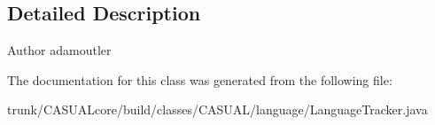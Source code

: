 \subsection{Detailed Description}
\begin{DoxyAuthor}{Author}
adamoutler 
\end{DoxyAuthor}


The documentation for this class was generated from the following file\-:\begin{DoxyCompactItemize}
\item 
trunk/\-C\-A\-S\-U\-A\-Lcore/build/classes/\-C\-A\-S\-U\-A\-L/language/Language\-Tracker.\-java\end{DoxyCompactItemize}
